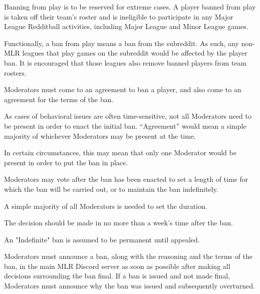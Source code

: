\begin{deepEnumerate}
\begin{deepEnumerate}
\begin{deepEnumerate}
\begin{deepEnumerate}
			\end{deepEnumerate}
			\item Banning from play is to be reserved for extreme cases. A player banned from play is taken off their team's roster and is ineligible to participate in any 
			Major League Redditball activities, including Major League and Minor League games.
			\begin{deepEnumerate}
				\item Functionally, a ban from play means a ban from the subreddit. As such, any non-MLR leagues that play games on the subreddit would be affected by the 
				player ban. It is encouraged that those leagues also remove banned players from team rosters.
			\end{deepEnumerate}
		\end{deepEnumerate}
		\item Moderators must come to an agreement to ban a player, and also come to an agreement for the terms of the ban.
		\begin{deepEnumerate}
			\item As cases of behavioral issues are often time-sensitive, not all Moderators need to be present in order to enact the initial ban. 
			“Agreement” would mean a simple majority of whichever Moderators may be present at the time.
			\begin{deepEnumerate}
				\item In certain circumstances, this may mean that only one Moderator would be present in order to put the ban in place.
			\end{deepEnumerate}
			\item Moderators may vote after the ban has been enacted to set a length of time for which the ban will be carried out, or to maintain the ban indefinitely.
			\begin{deepEnumerate}
				\item A simple majority of all Moderators is needed to set the duration.
				\item The decision should be made in no more than a week's time after the ban.
				\item An "Indefinite" ban is assumed to be permanent until appealed.
			\end{deepEnumerate}
		\end{deepEnumerate}
		\item Moderators must announce a ban, along with the reasoning and the terms of the ban, in the main MLR Discord server as soon as possible after making 
		all decisions surrounding the ban final. If a ban is issued and not made final, Moderators must announce why the ban was issued and subsequently overturned.

\end{deepEnumerate}
\end{deepEnumerate}
